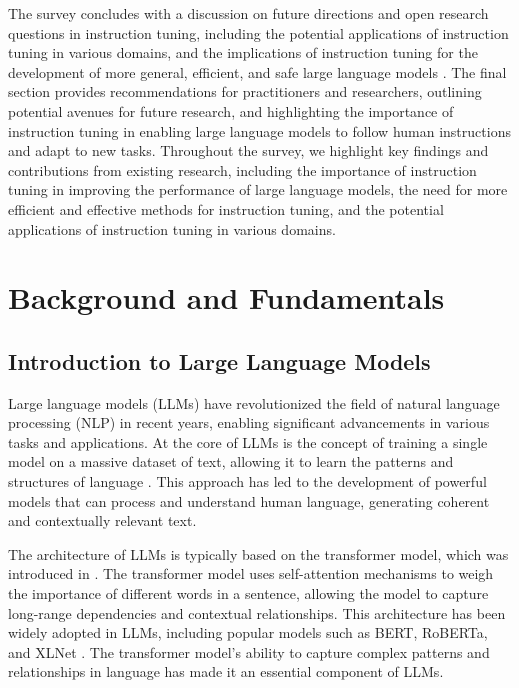 \documentclass[11pt]{article}
\begin{document}
The survey concludes with a discussion on future directions and open research questions in instruction tuning, including the potential applications of instruction tuning in various domains, and the implications of instruction tuning for the development of more general, efficient, and safe large language models \cite{ref23}. The final section provides recommendations for practitioners and researchers, outlining potential avenues for future research, and highlighting the importance of instruction tuning in enabling large language models to follow human instructions and adapt to new tasks. Throughout the survey, we highlight key findings and contributions from existing research, including the importance of instruction tuning in improving the performance of large language models, the need for more efficient and effective methods for instruction tuning, and the potential applications of instruction tuning in various domains.

\section{Background and Fundamentals}

\subsection{Introduction to Large Language Models}

Large language models (LLMs) have revolutionized the field of natural language processing (NLP) in recent years, enabling significant advancements in various tasks and applications. At the core of LLMs is the concept of training a single model on a massive dataset of text, allowing it to learn the patterns and structures of language \cite{ref8}. This approach has led to the development of powerful models that can process and understand human language, generating coherent and contextually relevant text.

The architecture of LLMs is typically based on the transformer model, which was introduced in \cite{ref11}. The transformer model uses self-attention mechanisms to weigh the importance of different words in a sentence, allowing the model to capture long-range dependencies and contextual relationships. This architecture has been widely adopted in LLMs, including popular models such as BERT, RoBERTa, and XLNet \cite{ref25}. The transformer model's ability to capture complex patterns and relationships in language has made it an essential component of LLMs.
\end{document}
